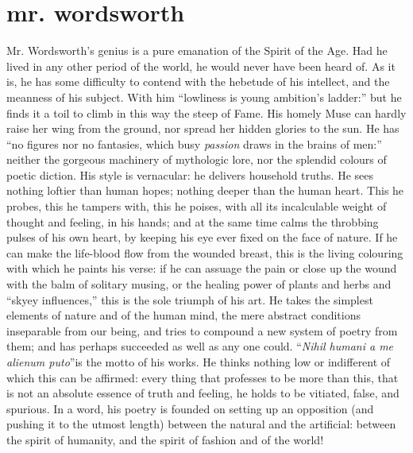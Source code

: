 \chapter[Mr. Wordsworth]{mr. wordsworth}

Mr. Wordsworth's genius is a pure emanation of the Spirit of the
Age.  Had he lived in any other period of the world, he would
never have been heard of. As it is, he has some difficulty to
contend with the hebetude of his intellect, and the meanness of
his subject. With him ``lowliness is young ambition's ladder:''
but he finds it a toil to climb in this way the steep of Fame. His
homely Muse can hardly raise her wing from the ground, nor spread
her hidden glories to the sun. He has ``no figures nor no
fantasies, which busy \emph{passion} draws in the brains of men:''
neither the gorgeous machinery of mythologic lore, nor the
splendid colours of poetic diction. His style is vernacular: he
delivers household truths.  He sees nothing loftier than human
hopes; nothing deeper than the human heart. This he probes, this
he tampers with, this he poises, with all its incalculable weight
of thought and feeling, in his hands; and at the same time calms
the throbbing pulses of his own heart, by keeping his eye ever
fixed on the face of nature. If he can make the life-blood flow
from the wounded breast, this is the living colouring with which
he paints his verse: if he can assuage the pain or close up the
wound with the balm of solitary musing, or the healing power of
plants and herbs and ``skyey influences,'' this is the sole
triumph of his art. He takes the simplest elements of nature and
of the human mind, the mere abstract conditions inseparable from
our being, and tries to compound a new system of poetry from them;
and has perhaps succeeded as well as any one could. ``\emph{Nihil
  humani a me alienum puto}''\textemdash is the motto of his
works. He thinks nothing low or indifferent of which this can be
affirmed: every thing that professes to be more than this, that is
not an absolute essence of truth and feeling, he holds to be
vitiated, false, and spurious. In a word, his poetry is founded on
setting up an opposition (and pushing it to the utmost length)
between the natural and the artificial: between the spirit of
humanity, and the spirit of fashion and of the world!

